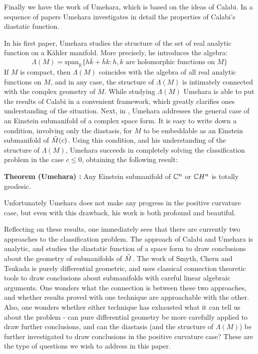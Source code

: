 Finally we have the work of Umehara, which is based on the ideas of Calabi.  In a sequence of papers \cite{Um1, Um2} Umehara investigates in detail the properties of Calabi's diastatic function.  

In his first paper, Umehara studies the structure of the set of real analytic function on a K\"{a}hler manifold.  More precisely, he introduces the algebra:
%
$$ \Lambda( M ) = \text{span}_{\mathbb{R}} \{ h \bar{k} + \bar{h} k : h, k \text{ are holomorphic functions on } M \} $$
%
If $M$ is compact, then $\Lambda(M)$ coincides with the algebra of all real analytic functions on $M$, and in any case, the structure of $\Lambda(M)$ is intimately connected with the complex geometry of $M$.  While studying $\Lambda(M)$ Umehara is able to put the results of Calabi in a convenient framework, which greatly clarifies ones understanding of the situation.  Next, in \cite{Um2}, Umehara addresses the general case of an Einstein submanifold of a complex space form.  It is easy to write down a condition, involving only the diastasis, for $M$ to be embeddable as an Einstein submanifold of $\tilde{M}(c)$.  Using this condition, and his understanding of the structure of $\Lambda(M)$, Umehara succeeds in completely solving the classification problem in the case $c \leq 0$, obtaining the following result:

{\bf Theorem (Umehara) :} Any Einstein submanifold of $\mathbb{C}^n$ or $\mathbb{C}H^n$ is totally geodesic.

Unfortunately Umehara does not make any progress in the positive curvature case, but even with this drawback, his work is both profound and beautiful.

Reflecting on these results, one immediately sees that there are currently two approaches to the classification problem.  The approach of Calabi and Umehara is analytic, and studies the diastatic function of a space form to draw conclusions about the geometry of submanifolds of $\tilde{M}$.  The work of Smyth, Chern and Tsukada is purely differential geometric, and uses classical connection theoretic tools to draw conclusions about submanifolds with careful linear algebraic arguments.  One wonders what the connection is between these two approaches, and whether results proved with one technique are approachable with the other.  Also, one wonders whether either technique has exhausted what it can tell us about the problem - can pure differential geometry be more carefully applied to draw further conclusions, and can the diastasis (and the structure of $\Lambda(M)$) be further investigated to draw conclusions in the positive curvature case?  These are the type of questions we wish to address in this paper.
